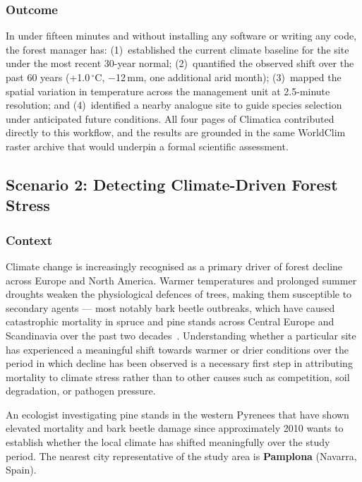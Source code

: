 \subsubsection{Outcome}

In under fifteen minutes and without installing any software or writing any
code, the forest manager has: (1)~established the current climate baseline for
the site under the most recent 30-year normal; (2)~quantified the observed
shift over the past 60 years (+1.0\,$^\circ$C, $-$12\,mm, one additional arid
month); (3)~mapped the spatial variation in temperature across the management
unit at 2.5-minute resolution; and (4)~identified a nearby analogue site to
guide species selection under anticipated future conditions. All four pages of
Climatica contributed directly to this workflow, and the results are grounded
in the same WorldClim raster archive that would underpin a formal scientific
assessment.

\subsection{Scenario 2: Detecting Climate-Driven Forest Stress}\label{EVAL_DEMO_DECLINE}

\subsubsection{Context}

Climate change is increasingly recognised as a primary driver of forest decline
across Europe and North America. Warmer temperatures and prolonged summer
droughts weaken the physiological defences of trees, making them susceptible
to secondary agents --- most notably bark beetle outbreaks, which have caused
catastrophic mortality in spruce and pine stands across Central Europe and
Scandinavia over the past two decades~\cite{seidl2017bark}. Understanding
whether a particular site has experienced a meaningful shift towards warmer or
drier conditions over the period in which decline has been observed is a
necessary first step in attributing mortality to climate stress rather than to
other causes such as competition, soil degradation, or pathogen pressure.

An ecologist investigating pine stands in the western Pyrenees that have shown
elevated mortality and bark beetle damage since approximately 2010 wants to
establish whether the local climate has shifted meaningfully over the study
period. The nearest city representative of the study area is \textbf{Pamplona}
(Navarra, Spain).

